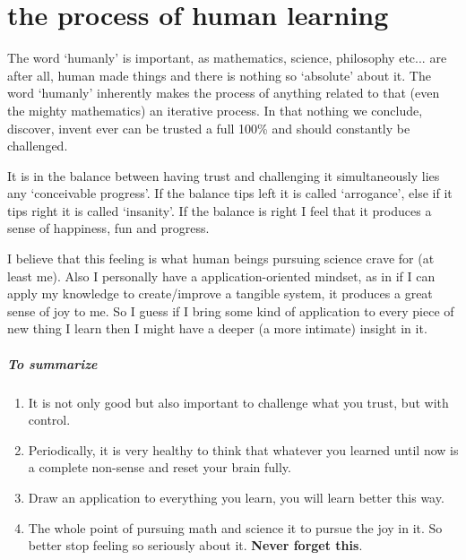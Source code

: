 \documentclass[./main.tex]{subfiles}
\begin{document}
\chapter*{the process of human learning}

The word `humanly' is important, as mathematics, science, philosophy etc... are after all, human made things and there is nothing so `absolute' about it.
The word `humanly' inherently makes the process of anything related to that (even the mighty mathematics) an iterative process.
In that nothing we conclude, discover, invent ever can be trusted a full 100\% and should constantly be challenged.

It is in the balance between having trust and challenging it simultaneously lies any `conceivable progress'.
If the balance tips left it is called `arrogance', else if it tips right it is called  `insanity'.
If the balance is right I feel that it produces a sense of happiness, fun and progress.

I believe that this feeling is what human beings pursuing science crave for (at least me).
Also I personally have a application-oriented mindset, as in if I can apply my knowledge to create/improve a tangible system, it produces a great sense of joy to me.
So I guess if I bring some kind of application to every piece of new thing I learn then I might have a deeper (a more intimate) insight in it.

\paragraph{To summarize}
\begin{enumerate}
  \item It is not only good but also important to challenge what you trust, but with control.
  \item Periodically, it is very healthy to think that whatever you learned until now is a complete non-sense and reset your brain fully.
  \item Draw an application to everything you learn, you will learn better this way.
  \item The whole point of pursuing math and science it to pursue the joy in it. So better stop feeling so seriously about it. \textbf{Never forget this}.
\end{enumerate}
\end{document}
